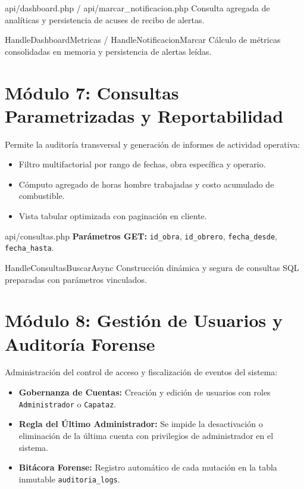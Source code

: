 \documentclass[11pt,a4paper,openany]{report}
\begin{document}
\begin{apibox}{api/dashboard.php / api/marcar\_notificacion.php}
    Consulta agregada de analíticas y persistencia de acuses de recibo de alertas.
\end{apibox}

\begin{methodbox}{HandleDashboardMetricas / HandleNotificacionMarcar}
    Cálculo de métricas consolidadas en memoria y persistencia de alertas leídas.
\end{methodbox}

\electricsep

\section{Módulo 7: Consultas Parametrizadas y Reportabilidad}

Permite la auditoría transversal y generación de informes de actividad operativa:
\begin{itemize}[leftmargin=1.5em]
    \item Filtro multifactorial por rango de fechas, obra específica y operario.
    \item Cómputo agregado de horas hombre trabajadas y costo acumulado de combustible.
    \item Vista tabular optimizada con paginación en cliente.
\end{itemize}

\begin{apibox}{api/consultas.php}
    \textbf{Parámetros GET:} \texttt{id\_obra}, \texttt{id\_obrero}, \texttt{fecha\_desde}, \texttt{fecha\_hasta}.
\end{apibox}

\begin{methodbox}{HandleConsultasBuscarAsync}
    Construcción dinámica y segura de consultas SQL preparadas con parámetros vinculados.
\end{methodbox}

\electricsep

\section{Módulo 8: Gestión de Usuarios y Auditoría Forense}

Administración del control de acceso y fiscalización de eventos del sistema:
\begin{itemize}[leftmargin=1.5em]
    \item \textbf{Gobernanza de Cuentas:} Creación y edición de usuarios con roles \texttt{Administrador} o \texttt{Capataz}.
    \item \textbf{Regla del Último Administrador:} Se impide la desactivación o eliminación de la última cuenta con privilegios de administrador en el sistema.
    \item \textbf{Bitácora Forense:} Registro automático de cada mutación en la tabla inmutable \texttt{auditoria\_logs}.
\end{itemize}
\end{document}
